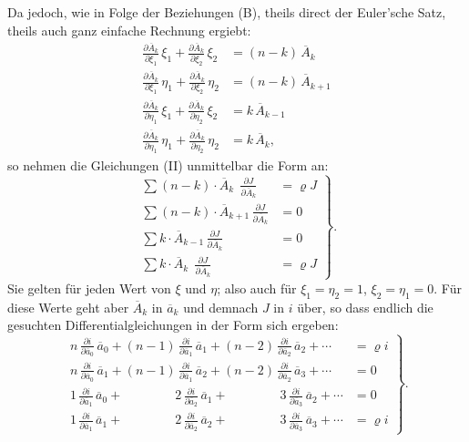 \documentclass[11pt]{article}
\providecommand{\weq}[2]{\begin{equation}\tag{#1}#2\end{equation}}
\begin{document}
Da jedoch, wie in Folge der Beziehungen (B), theils direct der
Euler'sche Satz, theils auch ganz einfache Rechnung ergiebt:
\[
\begin{aligned}
\frac{\partial \overline{A}_k}{\partial \xi_1}\,\xi_1 + \frac{\partial \overline{A}_k}{\partial \xi_2}\,\xi_2 &= (n-k)\,\overline{A}_k\\
\frac{\partial \overline{A}_k}{\partial \xi_1}\,\eta_1 + \frac{\partial \overline{A}_k}{\partial \xi_2}\,\eta_2 &= (n-k)\,\overline{A}_{k+1}\\
\frac{\partial \overline{A}_k}{\partial \eta_1}\,\xi_1 + \frac{\partial \overline{A}_k}{\partial \eta_2}\,\xi_2 &= k\,\overline{A}_{k-1}\\
\frac{\partial \overline{A}_k}{\partial \eta_1}\,\eta_1 + \frac{\partial \overline{A}_k}{\partial \eta_2}\,\eta_2 &= k\,\overline{A}_k,
\end{aligned}
\]
so nehmen die Gleichungen (II) unmittelbar die Form an:
\weq{II$_a$}{
\left.\begin{aligned}
\sum (n-k)\cdot \overline{A}_k\ \ \frac{\partial J}{\partial \overline{A}_k} &= \varrho J\\
\sum (n-k)\cdot \overline{A}_{k+1}\,\frac{\partial J}{\partial \overline{A}_k} &= 0\\
\sum k\cdot \overline{A}_{k-1}\,\frac{\partial J}{\partial \overline{A}_k} &= 0\\
\sum k\cdot \overline{A}_k\ \ \frac{\partial J}{\partial \overline{A}_k} &= \varrho J
\end{aligned}\right\}.
}
Sie gelten für jeden Wert von $\xi$ und $\eta$; also auch für $\xi_1 = \eta_2 = 1$, $\xi_2 = \eta_1 = 0$.
Für diese Werte geht aber $\overline{A}_k$ in $\overline{a}_k$ und demnach $J$ in $i$ über, so dass
endlich die gesuchten Differentialgleichungen in der Form sich ergeben:
\weq{III}{
\left.\begin{aligned}
n\,\frac{\partial i}{\partial \overline{a}_0}\,\overline{a}_0 + (n-1)\,\frac{\partial i}{\partial \overline{a}_1}\,\overline{a}_1 + (n-2)\,\frac{\partial i}{\partial \overline{a}_2}\,\overline{a}_2 + \cdots &= \varrho i\\
n\,\frac{\partial i}{\partial \overline{a}_0}\,\overline{a}_1 + (n-1)\,\frac{\partial i}{\partial \overline{a}_1}\,\overline{a}_2 + (n-2)\,\frac{\partial i}{\partial \overline{a}_2}\,\overline{a}_3 + \cdots &= 0\\
1\,\frac{\partial i}{\partial \overline{a}_1}\,\overline{a}_0 + \phantom{(n{-}1)}2\,\frac{\partial i}{\partial \overline{a}_2}\,\overline{a}_1 + \phantom{(n{-}2)}3\,\frac{\partial i}{\partial \overline{a}_3}\,\overline{a}_2 + \cdots &= 0\\
1\,\frac{\partial i}{\partial \overline{a}_1}\,\overline{a}_1 + \phantom{(n{-}1)}2\,\frac{\partial i}{\partial \overline{a}_2}\,\overline{a}_2 + \phantom{(n{-}2)}3\,\frac{\partial i}{\partial \overline{a}_3}\,\overline{a}_3 + \cdots &= \varrho i
\end{aligned}\right\}.
}
\end{document}
